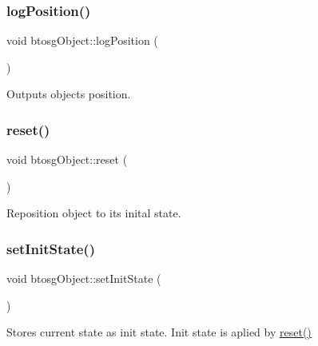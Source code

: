 \subsubsection{\texorpdfstring{log\+Position()}{logPosition()}}
{\footnotesize\ttfamily void btosg\+Object\+::log\+Position (\begin{DoxyParamCaption}{ }\end{DoxyParamCaption})\hspace{0.3cm}{\ttfamily [inline]}}

Outputs object\textquotesingle{}s position. \mbox{\label{classbtosgObject_a93983f9180dd0672f8779cf2baa78580}} 
\subsubsection{\texorpdfstring{reset()}{reset()}}
{\footnotesize\ttfamily void btosg\+Object\+::reset (\begin{DoxyParamCaption}{ }\end{DoxyParamCaption})\hspace{0.3cm}{\ttfamily [inline]}}

Reposition object to its inital state. \mbox{\label{classbtosgObject_ad1508a0ce28cfac83e5f0ff6245f91b5}} 
\subsubsection{\texorpdfstring{set\+Init\+State()}{setInitState()}\hspace{0.1cm}{\footnotesize\ttfamily [1/2]}}
{\footnotesize\ttfamily void btosg\+Object\+::set\+Init\+State (\begin{DoxyParamCaption}{ }\end{DoxyParamCaption})\hspace{0.3cm}{\ttfamily [inline]}}

Stores current state as init state. Init state is aplied by \hyperlink{classbtosgObject_a93983f9180dd0672f8779cf2baa78580}{reset()} \mbox{\label{classbtosgObject_a6ceb08e59ee95acaaef389ee198d2b56}} 
